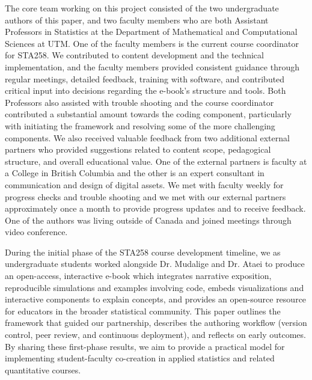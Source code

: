 \documentclass[11pt]{article}
\begin{document}
The core team working on this project consisted of the two undergraduate authors of this paper, and two faculty members who are both Assistant Professors in Statistics at the Department of Mathematical and Computational Sciences at UTM. One of the faculty members is the current course coordinator for STA258.
We contributed to content development and the technical implementation, and the faculty members provided consistent guidance through regular meetings, detailed feedback, training with software, and contributed critical input into decisions regarding the e-book’s structure and tools.
Both Professors also assisted with trouble shooting and the course coordinator contributed a substantial amount towards the coding component, particularly with initiating the framework and resolving some of the more challenging components.
We also received valuable feedback from two additional external partners 
who provided suggestions related to content scope, pedagogical structure, and overall educational value.
One of the external partners is faculty at a College in British Columbia and the other is an expert consultant in communication and design of digital assets.
We met with faculty weekly for progress checks and trouble shooting and we met with our external partners approximately once a month to provide progress updates and to receive feedback.
One of the authors was living outside of Canada and joined meetings through video conference.

During the initial phase of the STA258 course development timeline, we as undergraduate students worked alongside Dr. Mudalige and Dr. Ataei to produce an open-access, interactive e-book which integrates narrative exposition, reproducible simulations and examples involving code, embeds visualizations and interactive components to explain concepts, and provides an open-source resource for educators in the broader statistical community.
This paper outlines the framework that guided our partnership, describes the authoring workflow (version control, peer review, and continuous deployment), and reflects on early outcomes. By sharing these first-phase results, we aim to provide a practical model for implementing student-faculty co-creation in applied statistics and related quantitative courses.
\end{document}
